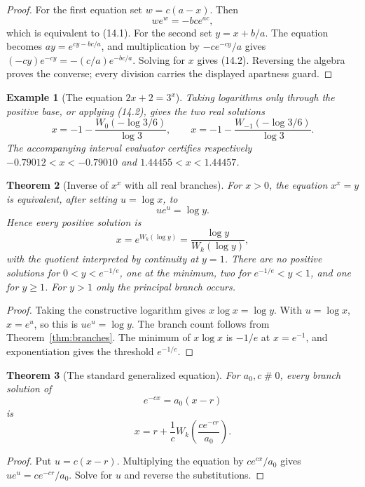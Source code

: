 \documentclass[11pt]{article}
\newtheorem{theorem}{Theorem}[section]
\newtheorem{example}[theorem]{Example}
\theoremstyle{definition}
\newcommand{\apart}{\mathrel{\#}}
\begin{document}
\begin{proof}
For the first equation set \(w=c(a-x)\).  Then
\[
 we^w=-bc e^{ac},
\]
which is equivalent to (14.1).  For the second set
\(y=x+b/a\).  The equation becomes
\(ay=e^{cy-bc/a}\), and multiplication by \(-c e^{-cy}/a\) gives
\((-cy)e^{-cy}=-(c/a)e^{-bc/a}\).  Solving for \(x\) gives (14.2).  Reversing
the algebra proves the converse; every division carries the displayed
apartness guard.
\end{proof}

\begin{example}[The equation \(2x+2=3^x\)]
Taking logarithms only through the positive base, or applying (14.2), gives the
two real solutions
\[
 x=-1-\frac{W_0(-\log3/6)}{\log3},
 \qquad
 x=-1-\frac{W_{-1}(-\log3/6)}{\log3}.
 \tag{14.3}
\]
The accompanying interval evaluator certifies respectively
\(-0.79012<x<-0.79010\) and \(1.44455<x<1.44457\).
\end{example}

\begin{theorem}[Inverse of \(x^x\) with all real branches]\label{thm:superroot}
For \(x>0\), the equation \(x^x=y\) is equivalent, after setting
\(u=\log x\), to
\[
 ue^u=\log y.
\]
Hence every positive solution is
\[
 x=e^{W_k(\log y)}
   =\frac{\log y}{W_k(\log y)},
 \tag{14.4}
\]
with the quotient interpreted by continuity at \(y=1\).  There are no positive
solutions for \(0<y<e^{-1/e}\), one at the minimum, two for
\(e^{-1/e}<y<1\), and one for \(y\ge1\).  For \(y>1\) only the principal
branch occurs.
\end{theorem}

\begin{proof}
Taking the constructive logarithm gives \(x\log x=\log y\).  With
\(u=\log x\), \(x=e^u\), so this is \(ue^u=\log y\).  The branch count follows
from Theorem~\ref{thm:branches}.  The minimum of \(x\log x\) is \(-1/e\) at
\(x=e^{-1}\), and exponentiation gives the threshold \(e^{-1/e}\).
\end{proof}

\begin{theorem}[The standard generalized equation]\label{thm:general-eqn}
For \(a_0,c\apart0\), every branch solution of
\[
 e^{-cx}=a_0(x-r)
\]
is
\[
 x=r+\frac1c W_k\!\left(\frac{c e^{-cr}}{a_0}\right).
 \tag{14.5}
\]
\end{theorem}

\begin{proof}
Put \(u=c(x-r)\).  Multiplying the equation by
\(c e^{cx}/a_0\) gives \(ue^u=ce^{-cr}/a_0\).  Solve for \(u\) and reverse
the substitutions.
\end{proof}
\end{document}
